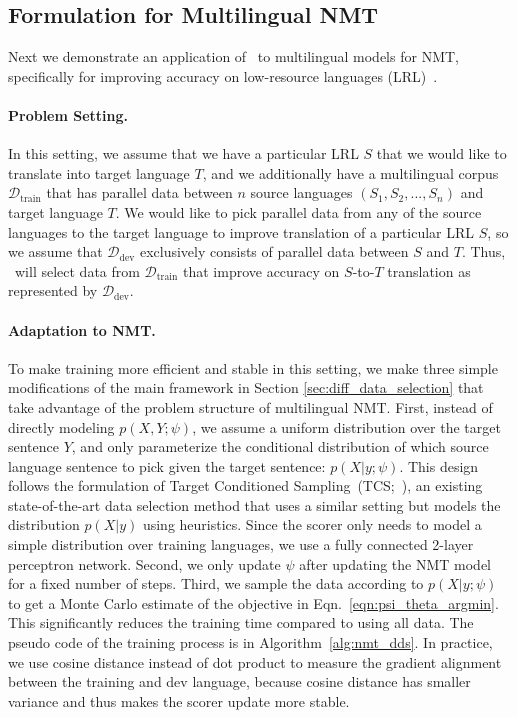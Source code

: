 \subsection{\label{sec:nmt_method}Formulation for Multilingual NMT}

Next we demonstrate an application of \dds~to multilingual models for NMT, specifically for improving accuracy on low-resource languages (LRL)~\citep{nmt_transfer,rapid_adapt_nmt}.

\paragraph{Problem Setting.} In this setting, we assume that we have a particular LRL $S$ that we would like to translate into target language $T$, and we additionally have a multilingual corpus $\mathcal{D}_{\text{train}}$ that has parallel data between $n$ source languages $(S_1, S_2, ..., S_n)$ and target language $T$. We would like to pick parallel data from any of the source languages to the target language to improve translation of a particular LRL $S$, so we assume that $\mathcal{D}_{\text{dev}}$ exclusively consists of parallel data between $S$ and $T$.
Thus, \dds~will select data from $\mathcal{D}_{\text{train}}$ that improve accuracy on $S$-to-$T$ translation as represented by $\mathcal{D}_{\text{dev}}$.

\paragraph{Adaptation to NMT.} To make training more efficient and stable in this setting, we make three simple modifications of the main framework in Section \ref{sec:diff_data_selection} that take advantage of the problem structure of multilingual NMT.
First, instead of directly modeling $p(X,Y;\psi)$, we assume a uniform distribution over the target sentence $Y$, %
and only parameterize the conditional distribution of which source language sentence to pick given the target sentence: $p(X|y;\psi)$. This design follows the formulation of Target Conditioned Sampling~(TCS;~\citet{TCS}), an existing state-of-the-art data selection method that uses a similar setting but models the distribution $p(X|y)$ using heuristics.  Since the scorer only needs to model a simple distribution over training languages, we use a fully connected 2-layer perceptron network.
Second, we only update $\psi$ after updating the NMT model for a fixed number of steps.
Third, we sample the data according to $p(X|y;\psi)$ to get a Monte Carlo estimate of the objective in Eqn.~\ref{eqn:psi_theta_argmin}.
This significantly reduces the training time compared to using all data. The pseudo code of the training process is in Algorithm~\ref{alg:nmt_dds}. In practice, we use cosine distance instead of dot product to measure the gradient alignment between the training and dev language, because cosine distance has smaller variance and thus makes the scorer update more stable.

